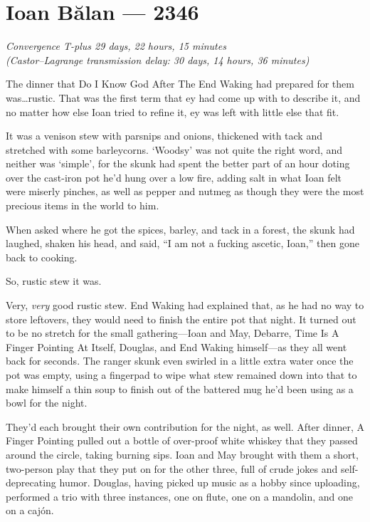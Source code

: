\hypertarget{ioan-bux103lan-2346}{%
\chapter{Ioan Bălan — 2346}}

\begin{center}
\emph{Convergence T-plus 29 days, 22 hours, 15 minutes}\\
\emph{(Castor--Lagrange transmission delay: 30 days, 14 hours, 36 minutes)}
\end{center}

\noindent The dinner that Do I Know God After The End Waking had prepared for them was\ldots rustic. That was the first term that ey had come up with to describe it, and no matter how else Ioan tried to refine it, ey was left with little else that fit.

It was a venison stew with parsnips and onions, thickened with tack and stretched with some barleycorns. `Woodsy' was not quite the right word, and neither was `simple', for the skunk had spent the better part of an hour doting over the cast-iron pot he'd hung over a low fire, adding salt in what Ioan felt were miserly pinches, as well as pepper and nutmeg as though they were the most precious items in the world to him.

When asked where he got the spices, barley, and tack in a forest, the skunk had laughed, shaken his head, and said, ``I am not a fucking ascetic, Ioan,'' then gone back to cooking.

So, rustic stew it was.

Very, \emph{very} good rustic stew. End Waking had explained that, as he had no way to store leftovers, they would need to finish the entire pot that night. It turned out to be no stretch for the small gathering—Ioan and May, Debarre, Time Is A Finger Pointing At Itself, Douglas, and End Waking himself—as they all went back for seconds. The ranger skunk even swirled in a little extra water once the pot was empty, using a fingerpad to wipe what stew remained down into that to make himself a thin soup to finish out of the battered mug he'd been using as a bowl for the night.

They'd each brought their own contribution for the night, as well. After dinner, A Finger Pointing pulled out a bottle of over-proof white whiskey that they passed around the circle, taking burning sips. Ioan and May brought with them a short, two-person play that they put on for the other three, full of crude jokes and self-deprecating humor. Douglas, having picked up music as a hobby since uploading, performed a trio with three instances, one on flute, one on a mandolin, and one on a cajón.

